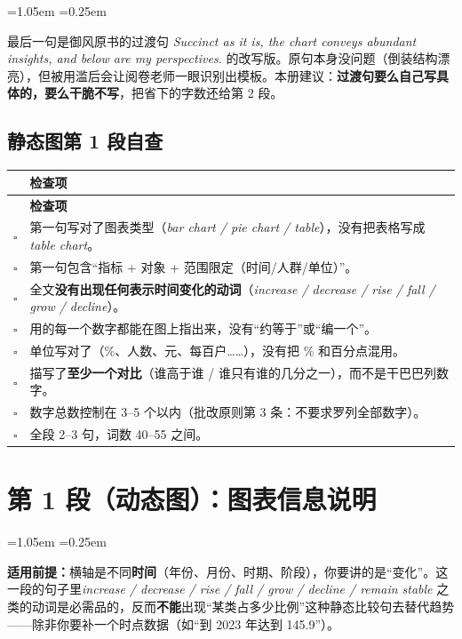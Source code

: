 \documentclass[11pt,a4paper]{ctexart}
\newcommand{\en}[1]{\textit{#1}}
\newenvironment{note}{%
  \par\addvspace{5pt}%
  \begin{list}{}{\leftmargin=1.05em \rightmargin=0.25em \listparindent=0pt
    \itemindent=0pt \topsep=0pt \parsep=2pt \itemsep=2pt \partopsep=0pt}%
  \item\relax\small\color{ink}%
}{%
  \end{list}\addvspace{5pt}%
}
\newcommand{\cb}{$\square$}
\begin{document}
\begin{note}
最后一句是御风原书的过渡句 \en{Succinct as it is, the chart conveys abundant insights, and below are my perspectives.} 的改写版。原句本身没问题（倒装结构漂亮），但被用滥后会让阅卷老师一眼识别出模板。本册建议：\textbf{过渡句要么自己写具体的，要么干脆不写}，把省下的字数还给第 2 段。
\end{note}

\subsection{静态图第 1 段自查}

\begin{longtable}{C{0.8cm} L{13.6cm}}
\toprule
& \textbf{检查项}\\
\midrule
\endfirsthead
\toprule
& \textbf{检查项}\\
\midrule
\endhead
\cb & 第一句写对了图表类型（\en{bar chart / pie chart / table}），没有把表格写成 \en{table chart}。\\
\cb & 第一句包含“指标 + 对象 + 范围限定（时间/人群/单位）”。\\
\cb & 全文\textbf{没有出现任何表示时间变化的动词}（\en{increase / decrease / rise / fall / grow / decline}）。\\
\cb & 用的每一个数字都能在图上指出来，没有“约等于”或“编一个”。\\
\cb & 单位写对了（\%、人数、元、每百户……），没有把 \% 和百分点混用。\\
\cb & 描写了\textbf{至少一个对比}（谁高于谁 / 谁只有谁的几分之一），而不是干巴巴列数字。\\
\cb & 数字总数控制在 3--5 个以内（批改原则第 3 条：不要求罗列全部数字）。\\
\cb & 全段 2--3 句，词数 40--55 之间。\\
\bottomrule
\end{longtable}

\clearpage

\section{第 1 段（动态图）：图表信息说明}

\begin{note}
\textbf{适用前提：}横轴是不同\textbf{时间}（年份、月份、时期、阶段），你要讲的是“变化”。这一段的句子里\en{increase / decrease / rise / fall / grow / decline / remain stable} 之类的动词是必需品的，反而\textbf{不能}出现“某类占多少比例”这种静态比较句去替代趋势——除非你要补一个时点数据（如“到 2023 年达到 145.9”）。
\end{note}
\end{document}

